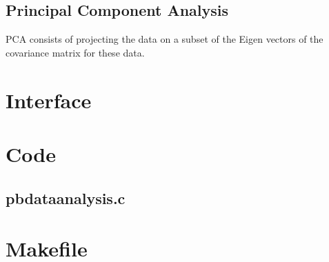 \subsection{Principal Component Analysis}

PCA consists of projecting the data on a subset of the Eigen vectors of the covariance matrix for these data.\\

\begin{scriptsize}
\begin{ttfamily}

\end{ttfamily}
\end{scriptsize}

\section{Interface}

\begin{scriptsize}
\begin{ttfamily}

\end{ttfamily}
\end{scriptsize}

\section{Code}

\subsection{pbdataanalysis.c}

\begin{scriptsize}
\begin{ttfamily}

\end{ttfamily}
\end{scriptsize}

\section{Makefile}

\begin{scriptsize}
\begin{ttfamily}

\end{ttfamily}
\end{scriptsize}

